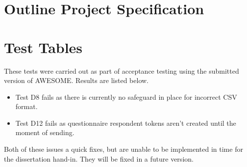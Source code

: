 \begin{appendices}

	\chapter{Outline Project Specification}
	


	\chapter{Test Tables}
	\label{app:testtables}
	
	These tests were carried out as part of acceptance testing using the submitted version of \ac{AWESOME}.
	Results are listed below.
	
	\begin{itemize}
		\item Test D8 fails as there is currently no safeguard in place for incorrect \ac{CSV} format.
		\item Test D12 fails as questionnaire respondent tokens aren't created until the moment of sending.
	\end{itemize}
	
	Both of these issues a quick fixes, but are unable to be implemented in time for the dissertation hand-in.
	They will be fixed in a future version.

	\begin{sidewaystable}
		

\end{sidewaystable}
\end{appendices}
